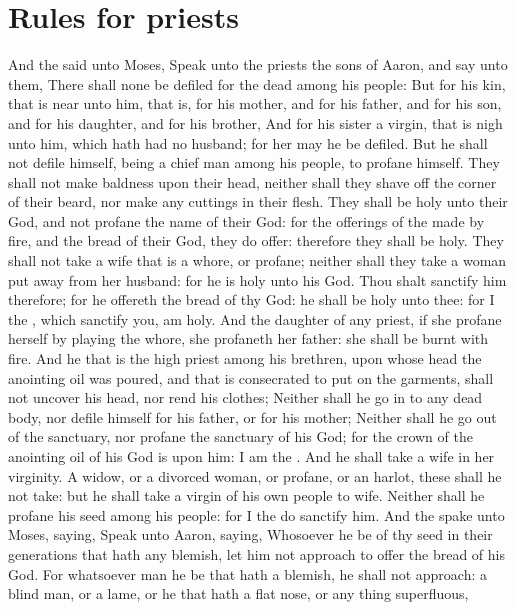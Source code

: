 \section*{Rules for priests}
\begin{biblechapter} %
\verse And the \LORD said unto Moses, Speak unto the priests the sons of Aaron, and say unto them, There shall none be defiled for the dead among his people:
\verse But for his kin, that is near unto him, that is, for his mother, and for his father, and for his son, and for his daughter, and for his brother,
\verse And for his sister a virgin, that is nigh unto him, which hath had no husband; for her may he be defiled.
\verse But he shall not defile himself, being a chief man among his people, to profane himself.
\verse They shall not make baldness upon their head, neither shall they shave off the corner of their beard, nor make any cuttings in their flesh.
\verse They shall be holy unto their God, and not profane the name of their God: for the offerings of the \LORD made by fire, and the bread of their God, they do offer: therefore they shall be holy.
\verse They shall not take a wife that is a whore, or profane; neither shall they take a woman put away from her husband: for he is holy unto his God.
\verse Thou shalt sanctify him therefore; for he offereth the bread of thy God: he shall be holy unto thee: for I the \LORD, which sanctify you, am holy.
\verse And the daughter of any priest, if she profane herself by playing the whore, she profaneth her father: she shall be burnt with fire.
\verse And he that is the high priest among his brethren, upon whose head the anointing oil was poured, and that is consecrated to put on the garments, shall not uncover his head, nor rend his clothes;
\verse Neither shall he go in to any dead body, nor defile himself for his father, or for his mother;
\verse Neither shall he go out of the sanctuary, nor profane the sanctuary of his God; for the crown of the anointing oil of his God is upon him: I am the \LORD.
\verse And he shall take a wife in her virginity.
\verse A widow, or a divorced woman, or profane, or an harlot, these shall he not take: but he shall take a virgin of his own people to wife.
\verse Neither shall he profane his seed among his people: for I the \LORD do sanctify him.
\verse And the \LORD spake unto Moses, saying,
\verse Speak unto Aaron, saying, Whosoever he be of thy seed in their generations that hath any blemish, let him not approach to offer the bread of his God.
\verse For whatsoever man he be that hath a blemish, he shall not approach: a blind man, or a lame, or he that hath a flat nose, or any thing superfluous,

\end{biblechapter}
